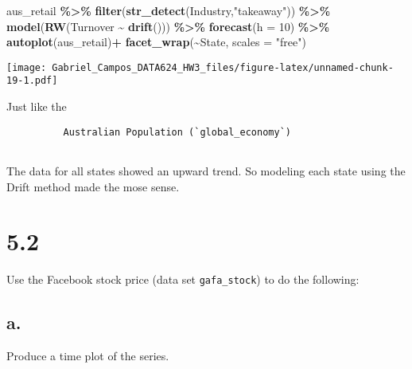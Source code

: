 \documentclass[
]{article}
\newenvironment{Shaded}{\begin{snugshade}}{\end{snugshade}}
\newcommand{\AttributeTok}[1]{\textcolor[rgb]{0.13,0.29,0.53}{#1}}
\newcommand{\DecValTok}[1]{\textcolor[rgb]{0.00,0.00,0.81}{#1}}
\newcommand{\FunctionTok}[1]{\textcolor[rgb]{0.13,0.29,0.53}{\textbf{#1}}}
\newcommand{\NormalTok}[1]{#1}
\newcommand{\SpecialCharTok}[1]{\textcolor[rgb]{0.81,0.36,0.00}{\textbf{#1}}}
\newcommand{\StringTok}[1]{\textcolor[rgb]{0.31,0.60,0.02}{#1}}
\begin{document}
\begin{Shaded}
\begin{Highlighting}[]
\NormalTok{aus\_retail }\SpecialCharTok{\%\textgreater{}\%}
  \FunctionTok{filter}\NormalTok{(}\FunctionTok{str\_detect}\NormalTok{(Industry,}\StringTok{"takeaway"}\NormalTok{)) }\SpecialCharTok{\%\textgreater{}\%}
  \FunctionTok{model}\NormalTok{(}\FunctionTok{RW}\NormalTok{(Turnover }\SpecialCharTok{\textasciitilde{}} \FunctionTok{drift}\NormalTok{())) }\SpecialCharTok{\%\textgreater{}\%}
  \FunctionTok{forecast}\NormalTok{(}\AttributeTok{h =} \DecValTok{10}\NormalTok{) }\SpecialCharTok{\%\textgreater{}\%}
  \FunctionTok{autoplot}\NormalTok{(aus\_retail)}\SpecialCharTok{+}
   \FunctionTok{facet\_wrap}\NormalTok{(}\SpecialCharTok{\textasciitilde{}}\NormalTok{State, }\AttributeTok{scales =} \StringTok{"free"}\NormalTok{)}
\end{Highlighting}
\end{Shaded}

\texttt{[image: Gabriel\_Campos\_DATA624\_HW3\_files/figure-latex/unnamed-chunk-19-1.pdf]}

Just like the

\begin{verbatim}
          Australian Population (`global_economy`)
          
\end{verbatim}

The data for all states showed an upward trend. So modeling each state
using the Drift method made the mose sense.

\hypertarget{section-1}{%
\section{5.2}\label{section-1}}

Use the Facebook stock price (data set \texttt{gafa\_stock}) to do the
following:

\hypertarget{a.}{%
\subsection{a.}\label{a.}}

Produce a time plot of the series.

\begin{Shaded}
\end{Shaded}
\end{document}

